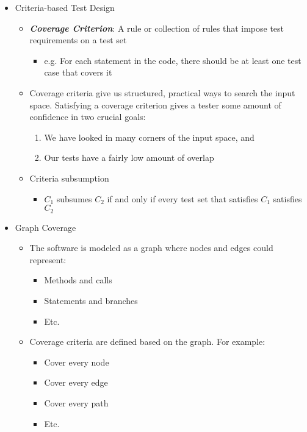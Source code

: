 \begin{itemize}
	\item Criteria-based Test Design
	\begin{itemize}
		\item \textbf{\textit{Coverage Criterion}}: A rule or collection of rules that impose test requirements on a test set
		\begin{itemize}
			\item e.g. For each statement in the code, there should be at least one test case that covers it
		\end{itemize}
		\item Coverage criteria give us structured, practical ways to search the input space. Satisfying a coverage criterion gives a tester some amount of confidence in two crucial goals:
		\begin{enumerate}
			\item We have looked in many corners of the input space, and
			\item Our tests have a fairly low amount of overlap
		\end{enumerate}
		\item Criteria subsumption
		\begin{itemize}
			\item $ C_1 $ subsumes $ C_2 $ if and only if every test set that satisfies $ C_1 $ satisfies $ C_2 $
		\end{itemize}
	\end{itemize}

	\item Graph Coverage
	\begin{itemize}
		\item The software is modeled as a graph where nodes and edges could represent:
		\begin{itemize}
			\item Methods and calls
			\item Statements and branches
			\item Etc.
		\end{itemize}
		\item Coverage criteria are defined based on the graph. For example:
		\begin{itemize}
			\item Cover every node
			\item Cover every edge
			\item Cover every path
			\item Etc.
		\end{itemize}



\end{itemize}
\end{itemize}
